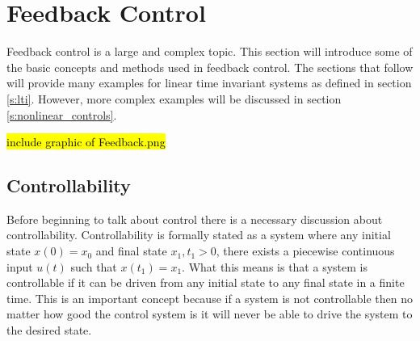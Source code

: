 \section{Feedback Control}\label{s:control_systems}

Feedback control is a large and complex topic. This section will
introduce some of the basic concepts and methods used in feedback
control. The sections that follow will provide many examples for linear time invariant systems as defined in section \ref{s:lti}. However, more complex examples will be discussed in section \ref{s:nonlinear_controls}.

\hl{include graphic of Feedback.png}

\subsection{Controllability}

Before beginning to talk about control there is a necessary discussion about controllability. Controllability is formally stated as a system where any initial state $x(0)=x_0$ and final state $x_1,t_1>0$, there exists a piecewise continuous input $u(t)$ such that $x(t_1)=x_1$. What this means is that a system is controllable if it can be driven from any initial state to any final state in a finite time. This is an important concept because if a system is not controllable then no matter how good the control system is it will never be able to drive the system to the desired state.

